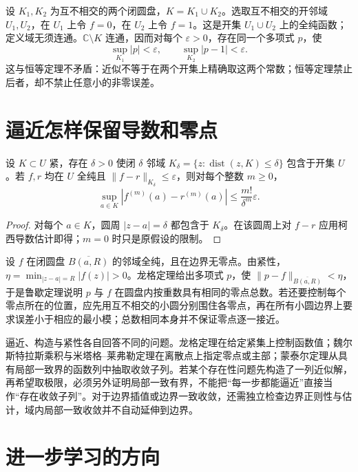 \begin{example}[两个圆盘上分别逼近不同常数]
设 $K_1,K_2$ 为互不相交的两个闭圆盘，$K=K_1\cup K_2$。选取互不相交的开邻域 $U_1,U_2$，在 $U_1$ 上令 $f=0$，在 $U_2$ 上令 $f=1$。这是开集 $U_1\cup U_2$ 上的全纯函数；定义域无须连通。$\mathbb C\setminus K$ 连通，因而对每个 $\varepsilon>0$，存在同一个多项式 $p$，使
\[
 \sup_{K_1}|p|<\varepsilon,\qquad
 \sup_{K_2}|p-1|<\varepsilon.
\]
这与恒等定理不矛盾：近似不等于在两个开集上精确取这两个常数；恒等定理禁止后者，却不禁止任意小的非零误差。
\end{example}

\section{逼近怎样保留导数和零点}

\begin{proposition}[稍大紧集上的误差控制内部导数]
\label{prop:ca-approx-derivatives}
设 $K\subset U$ 紧，存在 $\delta>0$ 使闭 $\delta$ 邻域
$K_\delta=\{z:\operatorname{dist}(z,K)\le\delta\}$ 包含于开集 $U$。若 $f,r$ 均在 $U$ 全纯且 $\|f-r\|_{K_\delta}\le\varepsilon$，则对每个整数 $m\ge0$，
\[
 \sup_{a\in K}|f^{(m)}(a)-r^{(m)}(a)|
 \le\frac{m!}{\delta^m}\varepsilon.
\]
\end{proposition}
\begin{proof}
对每个 $a\in K$，圆周 $|z-a|=\delta$ 都包含于 $K_\delta$。在该圆周上对 $f-r$ 应用柯西导数估计即得；$m=0$ 时只是原假设的限制。
\end{proof}

\begin{example}[用逼近转移零点计数]
设 $f$ 在闭圆盘 $\overline{B(a,R)}$ 的邻域全纯，且在边界无零点。由紧性，$\eta=\min_{|z-a|=R}|f(z)|>0$。龙格定理给出多项式 $p$，使 $\|p-f\|_{\overline{B(a,R)}}<\eta$，于是鲁歇定理说明 $p$ 与 $f$ 在圆盘内按重数具有相同的零点总数。若还要控制每个零点所在的位置，应先用互不相交的小圆分别围住各零点，再在所有小圆边界上要求误差小于相应的最小模；总数相同本身并不保证零点逐一接近。
\end{example}

逼近、构造与紧性各自回答不同的问题。龙格定理在给定紧集上控制函数值；魏尔斯特拉斯乘积与米塔格--莱弗勒定理在离散点上指定零点或主部；蒙泰尔定理从具有局部一致界的函数列中抽取收敛子列。若某个存在性问题先构造了一列近似解，再希望取极限，必须另外证明局部一致有界，不能把“每一步都能逼近”直接当作“存在收敛子列”。对于边界插值或边界一致收敛，还需独立检查边界正则性与估计，域内局部一致收敛并不自动延伸到边界。

\section{进一步学习的方向}


